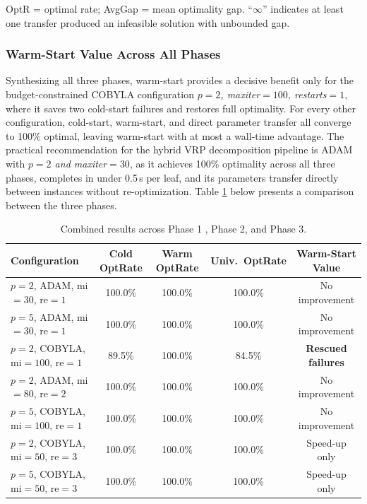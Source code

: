 \documentclass[a4paper]{report}
\begin{document}
{\begin{itemize}
\begin{itemize}
OptR = optimal rate; AvgGap = mean optimality gap. ``$\infty$'' indicates at least one transfer produced an infeasible solution with unbounded gap.

\subsubsection{Warm-Start Value Across All Phases}

Synthesizing all three phases, warm-start provides a decisive benefit only for the budget-constrained COBYLA configuration \textit{$p{=}2$, maxiter$=100$,
restarts$=1$}, where it saves two cold-start failures and restores full optimality. For every other configuration, cold-start, warm-start, and
direct parameter transfer all converge to 100\% optimal, leaving warm-start with at most a wall-time advantage. The practical recommendation for the
hybrid VRP decomposition pipeline is ADAM with \textit{$p{=}2$ and maxiter$=30$}, as it achieves 100\% optimality across all three phases, completes in under
0.5\,s per leaf, and its parameters transfer directly between instances without re-optimization. Table \ref{tab:wsallphases} below presents a comparison between the three phases.

\begin{table}[ht]
\centering
\setlength{\tabcolsep}{5pt}
\begin{tabular}{lcccc}
\toprule
\textbf{Configuration}
  & \textbf{Cold OptRate}
  & \textbf{Warm OptRate}
  & \textbf{Univ.\ OptRate}
  & \textbf{Warm-Start Value} \\
\midrule
$p{=}2$, ADAM,   mi$=30$,  re$=1$ & 100.0\% & 100.0\% & 100.0\% & No improvement \\
$p{=}5$, ADAM,   mi$=30$,  re$=1$ & 100.0\% & 100.0\% & 100.0\% & No improvement \\
$p{=}2$, COBYLA, mi$=100$, re$=1$ &  89.5\% & 100.0\% &  84.5\% & \textbf{Rescued failures} \\
$p{=}2$, ADAM,   mi$=80$,  re$=2$ & 100.0\% & 100.0\% & 100.0\% & No improvement \\
$p{=}5$, COBYLA, mi$=100$, re$=1$ & 100.0\% & 100.0\% & 100.0\% & No improvement \\
$p{=}2$, COBYLA, mi$=50$,  re$=3$ & 100.0\% & 100.0\% & 100.0\% & Speed-up only \\
$p{=}5$, COBYLA, mi$=50$,  re$=3$ & 100.0\% & 100.0\% & 100.0\% & Speed-up only \\
\bottomrule
\end{tabular}
\caption{Combined results across Phase 1 , Phase 2, and Phase 3.}
\label{tab:wsallphases}
\end{table} 


\end{itemize}
\end{itemize}}
\end{document}
